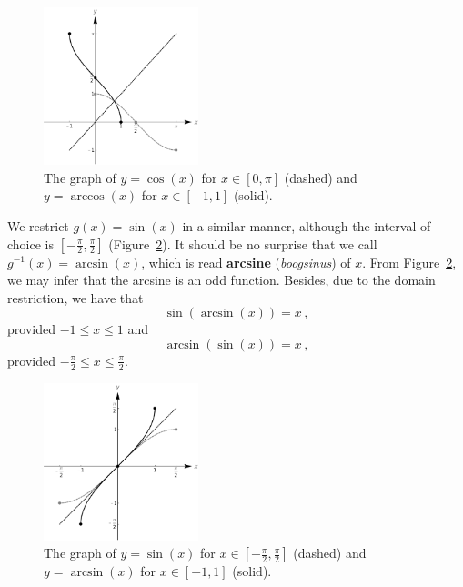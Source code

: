 \begin{figure}[H]
	\centering
	\centerline{
		\includegraphics[width=0.4\textwidth]{fig_trans_29}
	}
	\caption{The graph of $y=\cos(x)$ for $x\in[0, \pi]$ (dashed) and $y=\arccos(x)$ for $x\in[-1, 1]$ (solid).}
	\label{fig_trans_29}
\end{figure}


We restrict $g(x) = \sin(x)$ in a similar manner, although the interval of choice is $\left[ -\frac{\pi}{2}, \frac{\pi}{2}\right]$ (Figure~\ref{fig_trans_30}). It should be no surprise that we call $g^{-1}(x) = \arcsin(x)$, which is read \textbf{arcsine} (\textit{boogsinus}) of $x$. From Figure~\ref{fig_trans_30}, we may infer that the arcsine is an odd function. Besides, due to the domain restriction, we have that $$\sin(\arcsin(x)) = x\,,$$
provided $-1 \leq x \leq 1$ and  $$\arcsin(\sin(x)) = x\,,$$
provided $-\frac{\pi}{2} \leq x \leq \frac{\pi}{2}$.    


\begin{figure}[H]
	\centering
	\centerline{
		\includegraphics[width=0.4\textwidth]{fig_trans_30}
	}
	\caption{The graph of $y=\sin(x)$ for $x\in\left[-\frac{\pi}{2}, \frac{\pi}{2}\right]$ (dashed) and $y=\arcsin(x)$ for $x\in[-1, 1]$ (solid).}
	\label{fig_trans_30}
\end{figure}


